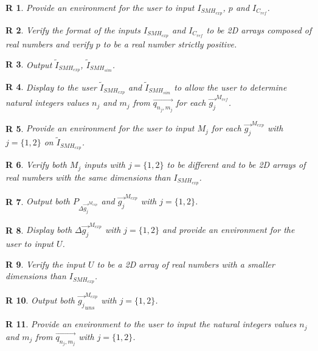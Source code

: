 \documentclass[12pt]{article}
\newtheorem{R}{R}
\begin{document}
\begin{R}
\label{R_1}
\normalfont Provide an environment for the user to input $I_{SMH_{exp}}$, $p$ and $I_{C_{ref}}$.
\end{R}
\begin{R}
\label{R_2}
\normalfont Verify the format of the inputs $I_{SMH_{exp}}$ and $I_{C_{ref}}$ to be 2D arrays composed of real numbers and verify $p$ to be a real number strictly positive.
\end{R}
\begin{R}
\label{R_3}
\normalfont Output $\widetilde{I}_{SMH_{exp}}$, $\widetilde{I}_{SMH_{sim}}$.
\end{R}
\begin{R}
\label{R_4}
\normalfont Display to the user $\widetilde{I}_{SMH_{exp}}$ and $\widetilde{I}_{SMH_{sim}}$ to allow the user to determine natural integers values $n_j$ and $m_j$ from $\overrightarrow{q_{n_j,m_j}}$ for each $\overrightarrow{g_j}^{M_{ref}}$.
\end{R}
\begin{R}
\label{R_5}
\normalfont Provide an environment for the user to input $M_j$ for each $\overrightarrow{g_{j}}^{M_{exp}}$ with $j=\{1,2\}$ on $\widetilde{I}_{SMH_{exp}}$.
\end{R}
\begin{R}
\label{R_6}
\normalfont Verify both $M_j$ inputs with $j=\{1,2\}$ to be different and to be 2D arrays of real numbers with the same dimensions than $I_{SMH_{exp}}$.
\end{R}
\begin{R}
\label{R_7}
\normalfont Output both $P_{\Delta \overrightarrow{g_{j}}^{M_{exp}}}$ and $\overrightarrow{g_{j}}^{M_{exp}}$ with $j=\{1,2\}$.
\end{R}
\begin{R}
\label{R_8}
\normalfont Display both $\Delta \overrightarrow{g_{j}}^{M_{exp}}$  with $j=\{1,2\}$ and provide an environment for the user to input $U$.
\end{R}
\begin{R}
\label{R_9}
\normalfont Verify the input $U$ to be a 2D array of real numbers with a smaller dimensions than $I_{SMH_{exp}}$.
\end{R}
\begin{R}
\label{R_10}
\normalfont Output both $\overrightarrow{g_{j}}_{uns}^{M_{exp}}$ with $j=\{1,2\}$.
\end{R}
\begin{R}
\label{R_11}
\normalfont Provide an environment to the user to input the natural integers values $n_j$ and $m_j$ from $\overrightarrow{q_{n_j,m_j}}$ with $j=\{1,2\}$. 
\end{R}
\end{document}
